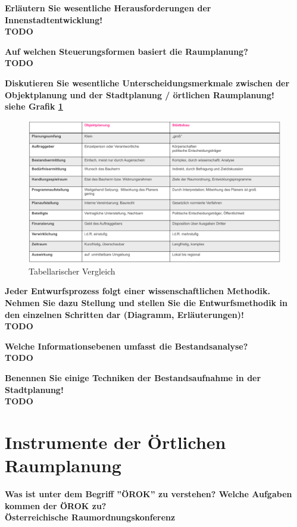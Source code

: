 \documentclass[]{article}
\newenvironment{question}{\vspace{8mm}\noindent\bfseries}{\\}
\begin{document}
\begin{question}
	Erläutern Sie wesentliche Herausforderungen der Innenstadtentwicklung!
\end{question}
TODO


\begin{question}
	Auf welchen Steuerungsformen basiert die Raumplanung?
\end{question}
TODO


\begin{question}
	Diskutieren Sie wesentliche Unterscheidungsmerkmale zwischen der Objektplanung und der Stadtplanung / örtlichen Raumplanung!
\end{question}
siehe Grafik \ref{fig:vergleichstaedtebauobjektplanung}
\begin{figure}[h!]
	\centering
	\includegraphics[width=0.7\linewidth]{images/vergleich_staedtebau_objektplanung}
	\caption{Tabellarischer Vergleich}
	\label{fig:vergleichstaedtebauobjektplanung}
\end{figure}


\begin{question}
	Jeder Entwurfsprozess folgt einer wissenschaftlichen Methodik. Nehmen Sie dazu Stellung und stellen Sie die Entwurfsmethodik in den einzelnen Schritten dar (Diagramm, Erläuterungen)!
\end{question}
TODO


\begin{question}
	Welche Informationsebenen umfasst die Bestandsanalyse?
\end{question}
TODO


\begin{question}
	Benennen Sie einige Techniken der Bestandsaufnahme in der Stadtplanung!
\end{question}
TODO


\section{Instrumente der Örtlichen Raumplanung}
\begin{question}
	Was ist unter dem Begriff ''ÖROK'' zu verstehen? Welche Aufgaben kommen der ÖROK zu?
\end{question}
Österreichische Raumordnungskonferenz
\end{document}
